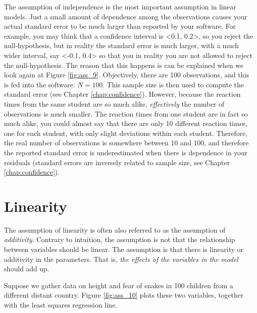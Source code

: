 \documentclass[]{book}\usepackage[]{graphicx}\usepackage[]{color}
\begin{document}
The assumption of independence is the most important assumption in linear models. Just a small amount of dependence among the observations causes your actual standard error to be much larger than reported by your software. For example, you may think that a confidence interval is <0.1, 0.2>, so you reject the null-hypothesis, but in reality the standard error is much larger, with a much wider interval, say <-0.1, 0.4> so that you in reality you are not allowed to reject the null-hypothesis. The reason that this happens is can be explained when we look again at Figure \ref{fig:ass_9}. Objectively, there are 100 observations, and this is fed into the software: $N=100$. This sample size is then used to compute the standard error (see Chapter \ref{chap:confidence}). However, because the reaction times from the same student are so much alike, \textit{effectively} the number of observations is much smaller. The reaction times from one student are in fact so much alike, you could almost say that there are only 10 different reaction times, one for each student, with only slight deviations within each student. Therefore, the real number of observations is somewhere between 10 and 100, and therefore the reported standard error is underestimated when there is dependence in your residuals (standard errors are inversely related to sample size, see Chapter \ref{chap:confidence}). 



\section{Linearity}

The assumption of linearity is often also referred to as the assumption of \textit{additivity}. Contrary to intuition, the assumption is not that the relationship between variables should be linear. The assumption is that there is linearity or additivity in the parameters. That is, \textit{the effects of the variables in the model} should add up. 

Suppose we gather data on height and fear of snakes in 100 children from a different distant country. Figure \ref{fig:ass_10} plots these two variables, together with the least squares regression line.
\end{document}
